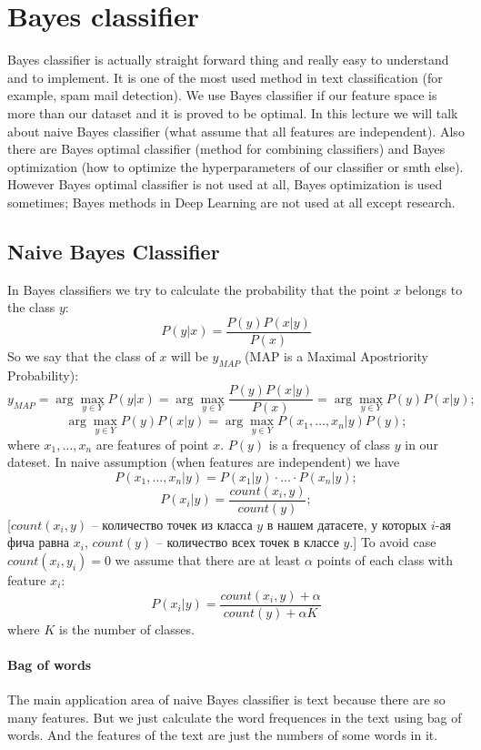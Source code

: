 \chapter{Bayes classifier}

{\sf Bayes classifier is actually straight forward thing and really easy to understand and to implement. It is one of the most used method in text classification (for example, spam mail detection). We use Bayes classifier if our feature space is more than our dataset and it is proved to be optimal. In this lecture we will talk about naive Bayes classifier (what assume that all features are independent). Also there are Bayes optimal classifier (method for combining classifiers) and Bayes optimization (how to optimize the hyperparameters of our classifier or smth else). However Bayes optimal classifier is not used at all, Bayes optimization is used sometimes; Bayes methods in Deep Learning are not used at all except research.}

\section{Naive Bayes Classifier}

In Bayes classifiers we try to calculate the probability that the point $x$ belongs to the class $y$:
$$P(y|x)=\frac{P(y)P(x|y)}{P(x)}$$
So we say that the class of $x$ will be $y_{MAP}$ (MAP is a Maximal Apostriority Probability):
$$y_{MAP}=\arg\max\limits_{y\in Y} P(y|x)=\arg\max\limits_{y\in Y}\frac{P(y)P(x|y)}{P(x)}=\arg\max\limits_{y\in Y} P(y)P(x|y);$$
$$\arg\max\limits_{y\in Y} P(y)P(x|y)=\arg\max\limits_{y\in Y} P(x_1,\ldots,x_n|y)P(y);$$
where $x_1,\ldots,x_n$ are features of point $x$. $P(y)$ is a frequency of class $y$ in our dateset. In naive assumption (when features are independent) we have
$$P(x_1,\ldots,x_n|y)=P(x_1|y)\cdot\ldots\cdot P(x_n|y);$$
$$P(x_i|y)=\frac{count(x_i,y)}{count(y)};$$
[$count(x_i, y)$ -- количество точек из класса $y$ в нашем датасете, у которых $i$-ая фича равна $x_i$, $count(y)$ -- количество всех точек в классе $y$.] To avoid case $count(x_i,y_i)=0$ we assume that there are at least $\alpha$ points of each class with feature $x_i$:
$$P (x_i|y)=\frac{count(x_i,y)+\alpha}{count(y)+\alpha K}$$
where $K$ is the number of classes.

\subsubsection*{Bag of words}

The main application area of naive Bayes classifier is text because there are so many features. But we just calculate the word frequences in the text using bag of words. And the features of the text are just the numbers of some words in it.

